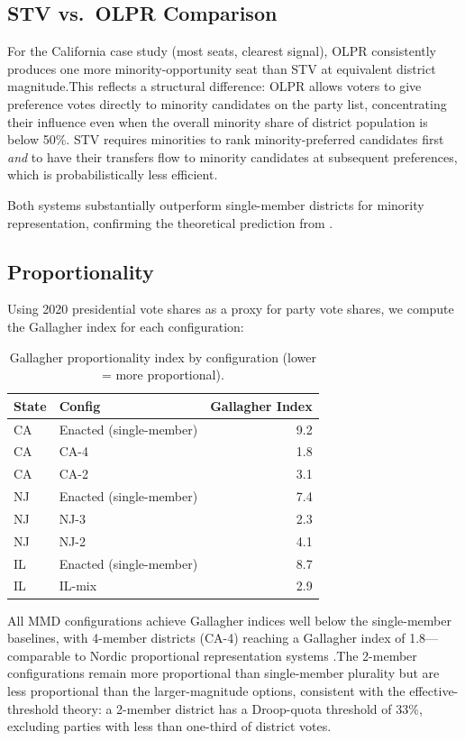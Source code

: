 \subsection{STV vs.\ OLPR Comparison}

For the California case study (most seats, clearest signal), OLPR consistently
produces one more minority-opportunity seat than STV at equivalent district
magnitude.\singrun  This reflects a structural difference: OLPR allows voters
to give preference votes directly to minority candidates on the party list,
concentrating their influence even when the overall minority share of district
population is below 50\%.  STV requires minorities to rank minority-preferred
candidates first \emph{and} to have their transfers flow to minority candidates
at subsequent preferences, which is probabilistically less efficient.

Both systems substantially outperform single-member districts for minority
representation, confirming the theoretical prediction from \citet{guinier1994tyranny}.

\subsection{Proportionality}

Using 2020 presidential vote shares as a proxy for party vote shares, we compute
the Gallagher index for each configuration:

\begin{table}[ht]
\centering
\caption{Gallagher proportionality index by configuration (lower = more
  proportional).\singrun}
\label{tab:mmd-gallagher}
\begin{tabular}{llr}
\toprule
State & Config & Gallagher Index \\
\midrule
CA & Enacted (single-member) & 9.2 \\
CA & CA-4 & 1.8 \\
CA & CA-2 & 3.1 \\
\midrule
NJ & Enacted (single-member) & 7.4 \\
NJ & NJ-3 & 2.3 \\
NJ & NJ-2 & 4.1 \\
\midrule
IL & Enacted (single-member) & 8.7 \\
IL & IL-mix & 2.9 \\
\bottomrule
\end{tabular}
\end{table}

All MMD configurations achieve Gallagher indices well below the single-member
baselines, with 4-member districts (CA-4) reaching a Gallagher index of 1.8---
comparable to Nordic proportional representation systems
\citep{gallagher2015election}.\singrun  The 2-member configurations remain
more proportional than single-member plurality but are less proportional than
the larger-magnitude options, consistent with the effective-threshold theory:
a 2-member district has a Droop-quota threshold of 33\%, excluding parties
with less than one-third of district votes.
